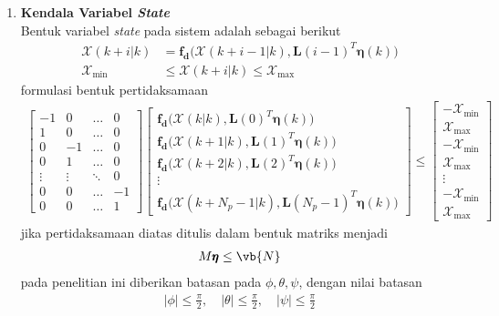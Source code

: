 \begin{enumerate}
    \item \textbf{Kendala Variabel \textit{State}} \\
    Bentuk variabel \textit{state} pada sistem adalah sebagai berikut
    \begin{align*}
        \pmb{\mathcal{X}}(k+i|k) &= \pmb{f_d}\bigl(\pmb{\mathcal{X}}(k+i-1|k),\pmb{L}(i-1)^T \pmb{\eta}(k)\bigr) \\
    \pmb{\mathcal{X}}_{\min} &\leq \pmb{\mathcal{X}}(k+i|k) \leq \pmb{\mathcal{X}}_{\max}
    \end{align*}
    formulasi bentuk pertidaksamaan
    \begin{align*}
        \begin{bmatrix}
            -1 & 0 & \hdots & 0 \\ 
            1 & 0 & \hdots & 0 \\
            0 & -1 & \hdots & 0 \\
            0 & 1 & \hdots & 0 \\
            \vdots & \vdots & \ddots & 0\\
            0 & 0 & \hdots & -1 \\
            0 & 0 & \hdots & 1 
        \end{bmatrix} \begin{bmatrix}
            \pmb{f_d}\bigl(\pmb{\mathcal{X}}(k|k),\pmb{L}(0)^T \pmb{\eta}(k)\bigr) \\
            \pmb{f_d}\bigl(\pmb{\mathcal{X}}(k+1|k),\pmb{L}(1)^T \pmb{\eta}(k)\bigr) \\
            \pmb{f_d}\bigl(\pmb{\mathcal{X}}(k+2|k),\pmb{L}(2)^T \pmb{\eta}(k)\bigr) \\
            \vdots \\
            \pmb{f_d}\bigl(\pmb{\mathcal{X}}(k+N_p-1|k),\pmb{L}(N_p-1)^T \pmb{\eta}(k)\bigr)
        \end{bmatrix} \leq \begin{bmatrix}
            -\pmb{\mathcal{X}}_{\min} \\ \pmb{\mathcal{X}}_{\max} \\ -\pmb{\mathcal{X}}_{\min} \\ \pmb{\mathcal{X}}_{\max} \\ \vdots \\ -\pmb{\mathcal{X}}_{\min} \\ \pmb{\mathcal{X}}_{\max}
        \end{bmatrix}
    \end{align*}
    jika pertidaksamaan diatas ditulis dalam bentuk matriks menjadi
    \begin{align*}
        M \pmb{\eta} \leq \vb{N}
    \end{align*}
    pada penelitian ini diberikan batasan pada $\phi,\theta,\psi$, dengan nilai batasan 
    \begin{align*}
        |\phi| \leq \frac{\pi}{2}, \quad |\theta| \leq \frac{\pi}{2}, \quad |\psi| \leq \frac{\pi}{2}
    \end{align*}
\end{enumerate}

